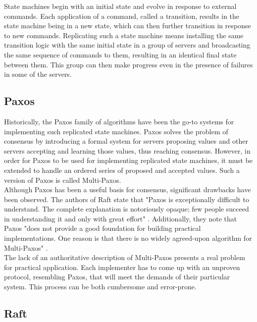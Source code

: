 State machines begin with an initial state and evolve in response to external commands. Each application of a command, called a transition, results in the state machine being in a new state, which can then further transition in response to new commands. Replicating such a state machine means installing the same transition logic with the same initial state in a group of servers and broadcasting the same sequence of commands to them, resulting in an identical final state between them. This group can then make progress even in the presence of failures in some of the servers.\\

\subsection{Paxos}

Historically, the Paxos family of algorithms have been the go-to systems for implementing such replicated state machines. Paxos solves the problem of consensus by introducing a formal system for servers proposing values and other servers accepting and learning those values, thus reaching consensus. However, in order for Paxos to be used for implementing replicated state machines, it must be extended to handle an ordered series of proposed and accepted values. Such a version of Paxos is called Multi-Paxos.\\

Although Paxos has been a useful basis for consensus, significant drawbacks have been observed. The authors of Raft state that "Paxos is exceptionally difficult to understand. The complete explanation is notoriously opaque; few people succeed in understanding it and only with great effort" \cite{raft}. Additionally, they note that Paxos "does not provide a good foundation for building practical implementations. One reason is that there is no widely agreed-upon algorithm for Multi-Paxos" \cite{raft}. \\

The lack of an authoritative description of Multi-Paxos presents a real problem for practical application. Each implementer has to come up with an unproven protocol, resembling Paxos, that will meet the demands of their particular system. This process can be both cumbersome and error-prone.

\subsection{Raft}

